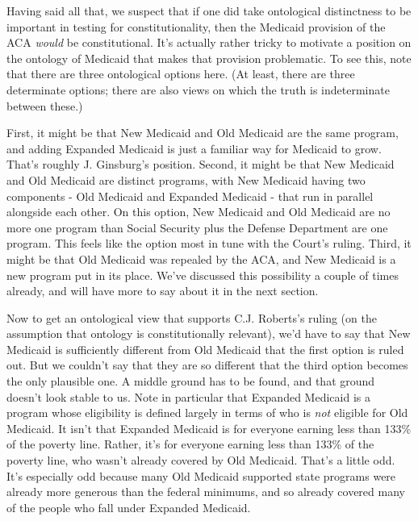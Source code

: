 \documentclass[
  11pt,
  letterpaper,
  DIV=11,
  numbers=noendperiod,
  oneside]{scrartcl}
\begin{document}
Having said all that, we suspect that if one did take ontological
distinctness to be important in testing for constitutionality, then the
Medicaid provision of the ACA \emph{would} be constitutional. It's
actually rather tricky to motivate a position on the ontology of
Medicaid that makes that provision problematic. To see this, note that
there are three ontological options here. (At least, there are three
determinate options; there are also views on which the truth is
indeterminate between these.)

First, it might be that New Medicaid and Old Medicaid are the same
program, and adding Expanded Medicaid is just a familiar way for
Medicaid to grow. That's roughly J. Ginsburg's position. Second, it might be that New
Medicaid and Old Medicaid are distinct programs, with New Medicaid
having two components - Old Medicaid and Expanded Medicaid - that run in
parallel alongside each other. On this option, New Medicaid and Old
Medicaid are no more one program than Social Security plus the Defense
Department are one program. This feels like the option most in tune with
the Court's ruling. Third, it might be that Old Medicaid was repealed by
the ACA, and New Medicaid is a new program put in its place. We've
discussed this possibility a couple of times already, and will have more
to say about it in the next section.

Now to get an ontological view that supports C.J. Roberts's ruling (on
the assumption that ontology is constitutionally relevant), we'd have to
say that New Medicaid is sufficiently different from Old Medicaid that
the first option is ruled out. But we couldn't say
that they are so different that the third option becomes the only
plausible one. A
middle ground has to be found, and that ground doesn't look stable to
us. Note in particular that Expanded Medicaid is a program whose
eligibility is defined largely in terms of who is \emph{not} eligible
for Old Medicaid. It isn't that Expanded Medicaid is for everyone
earning less than 133\% of the poverty line. Rather, it's for everyone
earning less than 133\% of the poverty line, who wasn't already covered
by Old Medicaid. That's a little odd. It's especially odd because many
Old Medicaid supported state programs were already more generous than
the federal minimums, and so already covered many of the people who fall
under Expanded Medicaid.
\end{document}
